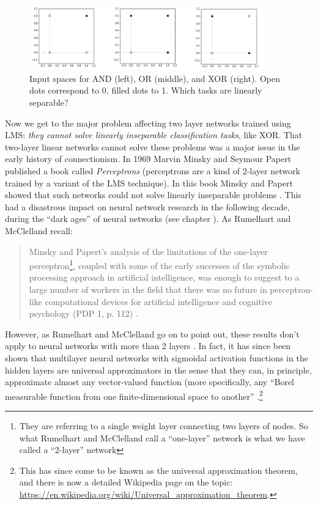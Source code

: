 \begin{figure}[h]
\centering
\includegraphics[width=0.9\textwidth]{images/booleanInputSpaces.png}
\caption[Jeff Yoshimi.]{Input spaces for AND (left), OR (middle), and XOR (right). Open dots correspond to 0, filled dots to 1. Which tasks are linearly separable?}
\label{boolean_inputspace}
\end{figure}

Now we get to the major problem affecting two layer networks trained using LMS: \emph{they cannot solve linearly inseparable classification tasks}, like XOR. That two-layer linear networks cannot solve these problems was a major issue in the early history of connectionism. In 1969 Marvin Minsky and Seymour Papert published a book called {\em Perceptrons} (perceptrons are a kind of 2-layer network trained by a variant of the LMS technique). In this book Minsky and Papert showed that such networks could not solve linearly inseparable problems \cite{minsky1969perceptrons}. This had a disastrous impact on neural network research in the following decade, during the ``dark ages'' of neural networks (see chapter ). As Rumelhart and McClelland recall:

\begin{quote}
Minsky and Papert's analysis of the limitations of the one-layer perceptron\footnote{They are referring to a single weight layer connecting two layers of nodes. So what Rumelhart and McClelland call a ``one-layer'' network is what we have called a ``2-layer'' network}, coupled with some of the early successes of the symbolic processing approach in artificial intelligence, was enough to suggest to a large number of workers in the field that there was no future in perceptron-like computational devices for artificial intelligence and cognitive psychology (PDP 1, p. 112) \cite{rumelhart1986parallel}.
\end{quote}

However, as Rumelhart and McClelland go on to point out, these results don't apply to neural networks with more than 2 layers \cite{rumelhart1986parallel}. In fact, it has since been shown that multilayer neural networks with sigmoidal activation functions in the hidden layers are universal approximators in the sense that they can, in principle, approximate almost any vector-valued function (more specifically, any ``Borel measurable function from one finite-dimensional space to another'' \cite{hornik1989multilayer}.\footnote{This has since come to be known as the universal approximation theorem, and there is now a detailed Wikipedia page on the topic: \url{https://en.wikipedia.org/wiki/Universal_approximation_theorem}.}

